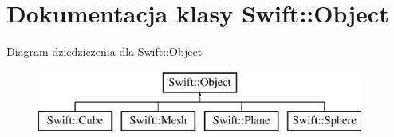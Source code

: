 \hypertarget{class_swift_1_1_object}{\section{Dokumentacja klasy Swift\-:\-:Object}
\label{class_swift_1_1_object}
}
Diagram dziedziczenia dla Swift\-:\-:Object\begin{figure}[H]
\begin{center}
\leavevmode
\includegraphics[height=2.000000cm]{class_swift_1_1_object}
\end{center}
\end{figure}
